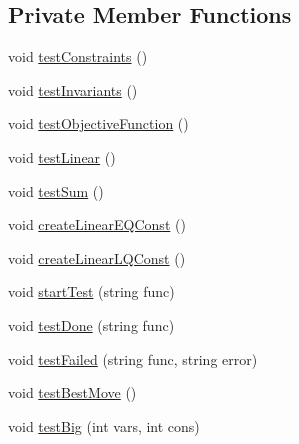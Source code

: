 \subsection*{Private Member Functions}
\begin{DoxyCompactItemize}
\item 
void \hyperlink{class_test_afeffe2721f02998f1c7ae24b14da54df}{test\-Constraints} ()
\item 
void \hyperlink{class_test_a09b25c29500a2929e6d1c3147f205225}{test\-Invariants} ()
\item 
void \hyperlink{class_test_a5bbcd5e2a51b0e462f83901bfdefc6c1}{test\-Objective\-Function} ()
\item 
void \hyperlink{class_test_a59b6677561981a61b7db46d74f453782}{test\-Linear} ()
\item 
void \hyperlink{class_test_a12ea05841e28eceba60370c886398951}{test\-Sum} ()
\item 
void \hyperlink{class_test_ac3751ac5e703489dcbcf7fd478f52f65}{create\-Linear\-E\-Q\-Const} ()
\item 
void \hyperlink{class_test_ad24ce508194ece439f794f38ec99ea45}{create\-Linear\-L\-Q\-Const} ()
\item 
void \hyperlink{class_test_aa1c51c4cab3fa12c6c8a7dd48d0f0b37}{start\-Test} (string func)
\item 
void \hyperlink{class_test_a667edae13d984f15e3393e92b95977fb}{test\-Done} (string func)
\item 
void \hyperlink{class_test_a94e6179822022c2af782cd16a56c4345}{test\-Failed} (string func, string error)
\item 
void \hyperlink{class_test_ae42701594f0b771bc2f8c27e2e606498}{test\-Best\-Move} ()
\item 
void \hyperlink{class_test_acd44aea9739a41fef10cc33812334e85}{test\-Big} (int vars, int cons)
\end{DoxyCompactItemize}


